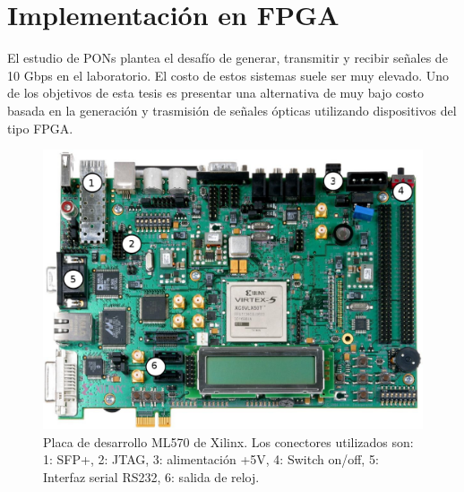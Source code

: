 \section{Implementación en FPGA}
El estudio de PONs plantea el desafío de generar, transmitir y recibir señales de 10 Gbps en el laboratorio. El costo de estos sistemas suele ser muy elevado. Uno de los objetivos de esta tesis es presentar una alternativa de muy bajo costo basada en la generación y trasmisión de señales ópticas utilizando dispositivos del tipo FPGA.

\begin{figure}[t]
  \centering
    \includegraphics[width=6in]{graphs/ml507.jpg}
\caption {Placa de desarrollo ML570 de Xilinx. Los conectores utilizados son: 1: SFP+, 2: JTAG, 3: alimentación +5V, 4: Switch on/off, 5: Interfaz serial RS232, 6: salida de reloj.}
\label{fig:fpga}
\end{figure}

